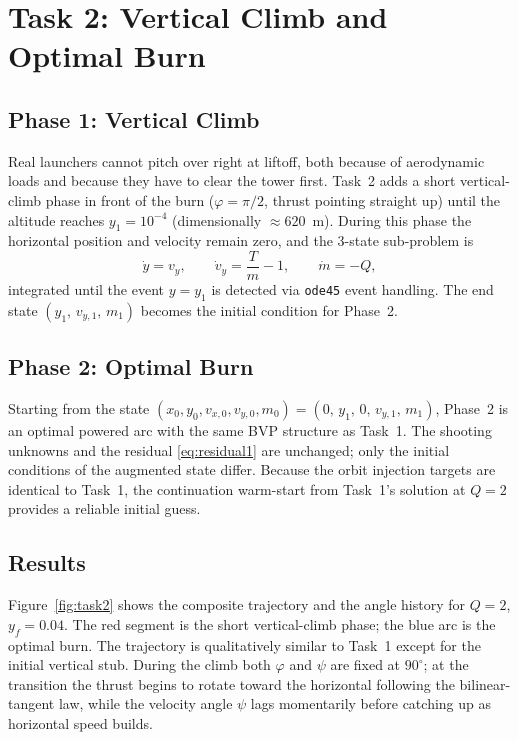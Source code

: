 \documentclass[../main.tex]{subfiles}
\begin{document}
\section{Task 2: Vertical Climb and Optimal Burn}\label{sec:task2}

\subsection{Phase 1: Vertical Climb}

Real launchers cannot pitch over right at liftoff, both because of aerodynamic loads and because they have to clear the tower first. Task~2 adds a short vertical-climb phase in front of the burn ($\varphi = \pi/2$, thrust pointing straight up) until the altitude reaches $y_1 = 10^{-4}$ (dimensionally $\approx 620$~m). During this phase the horizontal position and velocity remain zero, and the 3-state sub-problem is
\begin{equation}
    \dot{y} = v_y, \qquad
    \dot{v}_y = \frac{T}{m} - 1, \qquad
    \dot{m} = -Q,
    \label{eq:ode_vert}
\end{equation}
integrated until the event $y = y_1$ is detected via \texttt{ode45} event handling. The end state $(y_1,\, v_{y,1},\, m_1)$ becomes the initial condition for Phase~2.

\subsection{Phase 2: Optimal Burn}

Starting from the state $(x_0, y_0, v_{x,0}, v_{y,0}, m_0) = (0,\, y_1,\, 0,\, v_{y,1},\, m_1)$, Phase~2 is an optimal powered arc with the same BVP structure as Task~1. The shooting unknowns and the residual \eqref{eq:residual1} are unchanged; only the initial conditions of the augmented state differ. Because the orbit injection targets are identical to Task~1, the continuation warm-start from Task~1's solution at $Q = 2$ provides a reliable initial guess.

\subsection{Results}

Figure~\ref{fig:task2} shows the composite trajectory and the angle history for $Q = 2$, $y_f = 0.04$. The red segment is the short vertical-climb phase; the blue arc is the optimal burn. The trajectory is qualitatively similar to Task~1 except for the initial vertical stub. During the climb both $\varphi$ and $\psi$ are fixed at $90^\circ$; at the transition the thrust begins to rotate toward the horizontal following the bilinear-tangent law, while the velocity angle $\psi$ lags momentarily before catching up as horizontal speed builds.
\end{document}
